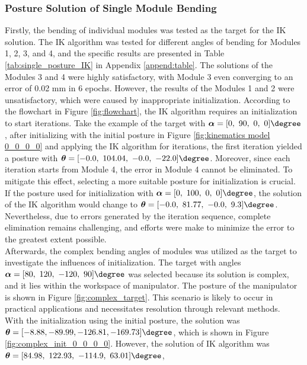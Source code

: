 \subsubsection{Posture Solution of Single Module Bending}
Firstly, the bending of individual modules was tested as the target for the IK solution. The 
IK algorithm was tested for different angles of bending for Modules 1, 2, 3, and 4, and the 
specific results are presented in Table \ref{tab:single_posture_IK} in Appendix \ref{append:table}. The 
solutions of the Modules 3 and 4 were highly satisfactory, with Module 3 even converging to an error of 0.02 mm 
in 6 epochs. However, the results of the Modules 1 and 2 were unsatisfactory, which were caused by inappropriate 
initialization. According to the flowchart in Figure \ref{fig:flowchart}, the IK algorithm requires an 
initialization to start iterations. Take the example of the target with 
$\boldsymbol{\alpha} = [0,\ 90,\ 0,\ 0]\degree$, after initializing with the initial posture in Figure 
\ref{fig:kinematics model 0_0_0_0} and applying the IK algorithm for iterations, the first iteration yielded 
a posture with 
$\boldsymbol{\theta} = [-0.0,\ 104.04,\ -0.0,\ -22.0]\degree$. Moreover, since each iteration starts from Module 4, 
the error in Module 4 cannot be eliminated. To mitigate this effect, selecting a more suitable posture for 
initialization is crucial. If the posture used for initialization with 
$\boldsymbol{\alpha} = [0,\ 100,\ 0,\ 0]\degree$, the solution of the IK algorithm would change to 
$\boldsymbol{\theta} = [-0.0,\ 81.77,\ -0.0,\ 9.3]\degree$. Nevertheless, due to errors generated by the 
iteration sequence, complete elimination remains challenging, and efforts were make to minimize the error to the 
greatest extent possible.  \\
Afterwards, the complex bending angles of modules was utilized as the target to investigate the influences of initialization. 
The target with angles $\boldsymbol{\alpha} = [80,\ 120,\ -120,\ 90]\degree$ was selected because its solution is complex, 
and it lies within the workspace of manipulator. The posture of the manipulator is shown in Figure 
\ref{fig:complex_target}. This scenario is likely to occur in practical applications and necessitates resolution 
through relevant methods. \\
With the initialization using the initial posture, the solution was 
$\boldsymbol{\theta} = [-8.88, -89.99, -126.81, -169.73]\degree$, which is shown in Figure \ref{fig:complex_init_0_0_0_0}. 
However, the solution of IK algorithm was $\boldsymbol{\theta} = [84.98,\ 122.93,\ -114.9,\ 63.01]\degree$, 
